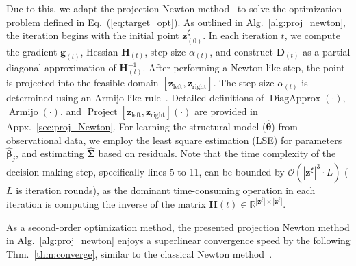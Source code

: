 \documentclass{article}
\theoremstyle{plain}
\theoremstyle{definition}
\def \H {\mathbf{H}}
\def \Eq {Eq.}
\def \thm {Thm.}
\def \g {\mathbf{g}}
\def \H {\mathbf{H}}
\def \g {\mathbf{g}}
\def \H {\mathbf{H}}
\def \D {\mathbf{D}}
\def \z {\mathbf{z}}
\begin{document}
Due to this, we adapt the projection Newton method~\citep{bertsekas1982projected} to solve the optimization problem defined in \Eq~(\ref{eq:target_opt}). 
As outlined in Alg.~\ref{alg:proj_newton}, the iteration begins with the initial point $\z^\xi_{(0)}$. In each iteration $t$, we compute the gradient $\g_{(t)}$, Hessian $\H_{(t)}$, step size $\alpha_{(t)}$, and construct $\D_{(t)}$ as a partial diagonal approximation of $\H^{-1}_{(t)}$. After performing a Newton-like step, the point is projected into the feasible domain $\left[\z_{\operatorname*{left}}, \z_{\operatorname*{right}}\right]$.
The step size $\alpha_{(t)}$ is determined using an Armijo-like rule~\citep{boyd2004convex}. Detailed definitions of $\operatorname*{DiagApprox}(\cdot)$, $\operatorname*{Armijo}(\cdot)$, and $\operatorname*{Project}{\left[\z_{\operatorname*{left}}, \z_{\operatorname*{right}}\right]}(\cdot)$ are provided in Appx.~\ref{sec:proj_Newton}. For learning the structural model (\(\hat{\bm{\theta}}\)) from observational data, we employ the least square estimation (LSE) for parameters ${\hat{\bm{\beta}}_j}$, and estimating $\hat{\bm{\Sigma}}$ based on residuals.
Note that the time complexity of the decision-making step, specifically lines 5 to 11, can be bounded by $\mathcal{O}(|\z^\xi|^3\cdot L)$ ($L$ is iteration rounds), as the dominant time-consuming operation in each iteration is computing the inverse of the matrix $\H{(t)}\in\mathbb{R}^{|\z^\xi|\times|\z^\xi|}$.



As a second-order optimization method, the presented projection Newton method in Alg.~\ref{alg:proj_newton} enjoys a superlinear convergence speed by the following \thm~\ref{thm:converge}, similar to the classical Newton method~\citep{boyd2004convex}. 
\end{document}

